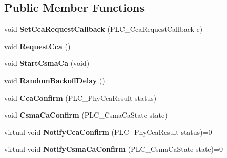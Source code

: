 \subsection*{\-Public \-Member \-Functions}
\begin{DoxyCompactItemize}
\item 
\hypertarget{classns3_1_1PLC__Mac_a9ccda352e399dcd918706fe4ee66a0bb}{void {\bfseries \-Set\-Cca\-Request\-Callback} (\-P\-L\-C\-\_\-\-Cca\-Request\-Callback c)}\label{classns3_1_1PLC__Mac_a9ccda352e399dcd918706fe4ee66a0bb}

\item 
\hypertarget{classns3_1_1PLC__Mac_a19c6fdcec31cc260d7a693bc88835df3}{void {\bfseries \-Request\-Cca} ()}\label{classns3_1_1PLC__Mac_a19c6fdcec31cc260d7a693bc88835df3}

\item 
\hypertarget{classns3_1_1PLC__Mac_afce2b58d5e04d132bbc8b23122a36b9c}{void {\bfseries \-Start\-Csma\-Ca} (void)}\label{classns3_1_1PLC__Mac_afce2b58d5e04d132bbc8b23122a36b9c}

\item 
\hypertarget{classns3_1_1PLC__Mac_a7c71e368a637aeea37257b87202159aa}{void {\bfseries \-Random\-Backoff\-Delay} ()}\label{classns3_1_1PLC__Mac_a7c71e368a637aeea37257b87202159aa}

\item 
\hypertarget{classns3_1_1PLC__Mac_a11c528f88433d9a1e3282e81033cf647}{void {\bfseries \-Cca\-Confirm} (\-P\-L\-C\-\_\-\-Phy\-Cca\-Result status)}\label{classns3_1_1PLC__Mac_a11c528f88433d9a1e3282e81033cf647}

\item 
\hypertarget{classns3_1_1PLC__Mac_aff4ca9f070971b39b63497cf27d9793f}{void {\bfseries \-Csma\-Ca\-Confirm} (\-P\-L\-C\-\_\-\-Csma\-Ca\-State state)}\label{classns3_1_1PLC__Mac_aff4ca9f070971b39b63497cf27d9793f}

\item 
\hypertarget{classns3_1_1PLC__Mac_a0a720ec80af731b095c8cfaa87184b49}{virtual void {\bfseries \-Notify\-Cca\-Confirm} (\-P\-L\-C\-\_\-\-Phy\-Cca\-Result status)=0}\label{classns3_1_1PLC__Mac_a0a720ec80af731b095c8cfaa87184b49}

\item 
\hypertarget{classns3_1_1PLC__Mac_a5862b8e436431044f8afbe755a94990e}{virtual void {\bfseries \-Notify\-Csma\-Ca\-Confirm} (\-P\-L\-C\-\_\-\-Csma\-Ca\-State state)=0}\label{classns3_1_1PLC__Mac_a5862b8e436431044f8afbe755a94990e}


\end{DoxyCompactItemize}

